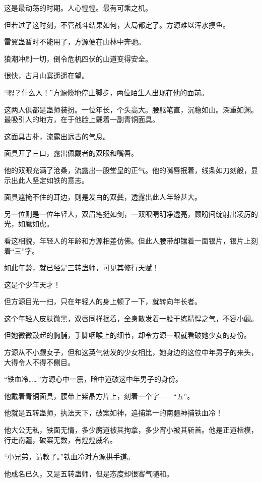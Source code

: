 \begin{this_body}
这是最动荡的时期。人心惶惶。最有可乘之机。

但若过了这时刻，不管战斗结果如何，大局都定了。方源难以浑水摸鱼。

雷翼蛊暂时不能用了，方源便在山林中奔驰。

狼潮冲刷一切，倒令危机四伏的山道变得安全。

很快，古月山寨遥遥在望。

“嗯？什么人！”方源倏地停止脚步，两位陌生人出现在他的面前。

这两人俱都是蛊师装扮。一位年长，个头高大。腰躯笔直，沉稳如山。深重如渊。最吸引人的地方，在于他脸上戴着一副青铜面具。

这面具古朴，流露出远古的气息。

面具开了三口，露出佩戴者的双眼和嘴唇。

他的双眼充满了沧桑，流露出一股堂皇的正气。他的嘴唇抿着，线条如刀刻般，显示出此人坚定如铁的意志。

面具遮掩不住的耳边，则是发白的双鬓，透露出此人年龄甚大。

另一位则是一位年轻人，双眉笔挺如剑，一双眼睛明净透亮，顾盼间绽射出凌厉的光，如鹰如虎。

看这相貌，年轻人的年龄和方源相差仿佛。但此人腰带却镶着一面银片，银片上刻着“三”字。

如此年龄，就已经是三转蛊师，可见其修行天赋！

这是个少年天才！

但方源目光一扫，只在年轻人的身上顿了一下，就转向年长者。

这个年轻人皮肤微黑，双唇同样抿着，全身散发着一股干练精悍之气，不容小觑。

但她微微鼓起的胸脯，手脚咽喉上的细节，却令方源一眼就看破她少女的身份。

方源从不小觑女子，但和这英气勃发的少女相比，她身边的这位中年男子的来头，大得令人不得不侧目。

“铁血冷……”方源心中一震，暗中道破这中年男子的身份。

他戴着青铜面具，腰带上紫晶方片上，刻着一个字——“五”。

他就是五转蛊师，执法天下，破案如神，追捕第一的南疆神捕铁血冷！

他大公无私，铁面无情，多少魔道被其拘拿，多少宵小被其斩首。他是正道楷模，行走南疆，破案无数，有煌煌威名。

“小兄弟，请教了。”铁血冷对方源拱手道。

他成名已久，又是五转蛊师，但是态度却很客气随和。


\end{this_body}
